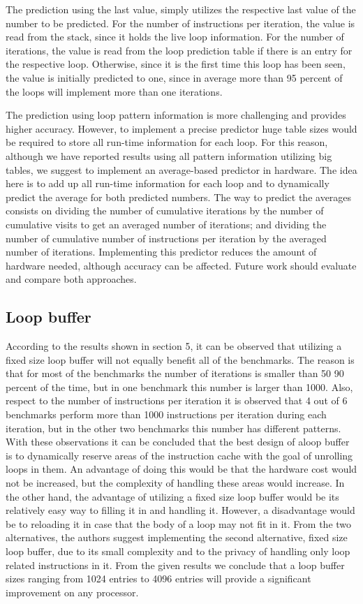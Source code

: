 \documentclass[11pt]{article}
\begin{document}
The prediction using the last value, simply utilizes the respective last value of the number to be predicted. For the number of instructions per iteration, the value is read from the stack, since it holds the live loop information. For the number of iterations, the value is read from the loop prediction table if there is an entry for the respective loop. Otherwise, since it is the first time this loop has been seen, the value is initially predicted to one, since in average more than 95 percent of the loops will implement more than one iterations.

The prediction using loop pattern information is more challenging and provides higher accuracy. However, to implement a precise predictor huge table sizes would be required to store all run-time information for each loop. For this reason, although we have reported results using all pattern information utilizing big tables, we suggest to implement an average-based predictor in hardware. The idea here is to add up all run-time information for each loop and to dynamically predict the average for both predicted numbers. The way to predict the averages consists on dividing the number of cumulative iterations by the number of cumulative visits to get an averaged number of iterations; and dividing the number of cumulative number of instructions per iteration by the averaged number of iterations. Implementing this predictor reduces the amount of hardware needed, although accuracy can be affected. Future work should evaluate and compare both approaches.

\subsection{Loop buffer} 

According to the results shown in section 5, it can be observed that utilizing a fixed size loop buffer will not equally benefit all of the benchmarks. The reason is that for most of the benchmarks the number of iterations is smaller than 50 90 percent of the time, but in one benchmark this number is larger than 1000. Also, respect to the number of instructions per iteration it is observed that 4 out of 6 benchmarks perform more than 1000 instructions per iteration during each iteration, but in the other two benchmarks this number has different patterns. With these observations it can be concluded that the best design of aloop buffer is to dynamically reserve areas of the instruction cache with the goal of unrolling loops in them. An advantage of doing this would be that the hardware cost would not be increased, but the complexity of handling these areas would increase. 
In the other hand, the advantage of utilizing a fixed size loop buffer would be its relatively easy way to filling it in and handling it. However, a disadvantage would be to reloading it in case that the body of a loop may not fit in it. 
From the two alternatives, the authors suggest implementing the second alternative, fixed size loop buffer, due to its small complexity and to the privacy of handling only loop related instructions in it. From the given results we conclude that a loop buffer sizes ranging from 1024 entries to 4096 entries will provide a significant improvement on any processor. 
\end{document}
